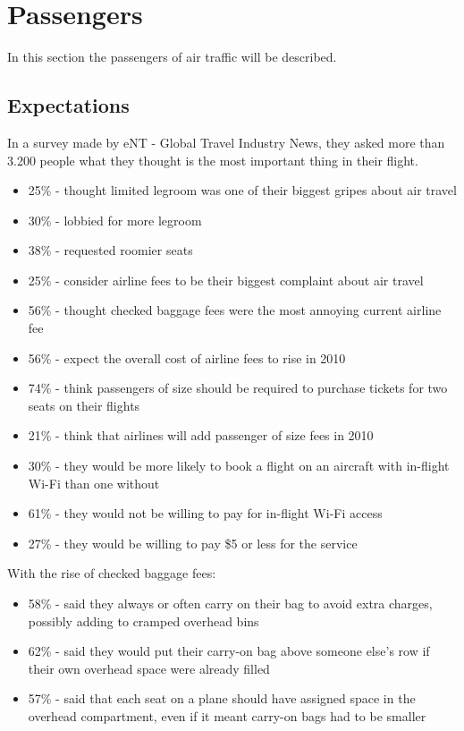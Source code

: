\section{Passengers}

In this section the passengers of air traffic will be described. 

\subsection{Expectations}
In a survey made by eNT - Global Travel Industry News, they asked more than 3.200 people what they thought is the most important thing in their flight.
\begin{itemize}
  \item 25\% - thought limited legroom was one of their biggest gripes about air travel
  \item 30\% - lobbied for more legroom
  \item 38\% - requested roomier seats
  \item 25\% - consider airline fees to be their biggest complaint about air travel
  \item 56\% - thought checked baggage fees were the most annoying current airline fee
  \item 56\% - expect the overall cost of airline fees to rise in 2010
 \item 74\% - think passengers of size should be required to purchase tickets for two seats on their flights
  \item 21\% - think that airlines will add passenger of size fees in 2010
  \item 30\% - they would be more likely to book a flight on an aircraft with in-flight Wi-Fi than one without
  \item 61\% - they would not be willing to pay for in-flight Wi-Fi access
  \item 27\% - they would be willing to pay \$5 or less for the service
\end{itemize}
With the rise of checked baggage fees:
\begin{itemize}
 \item 58\% - said they always or often carry on their bag to avoid extra charges, possibly adding to cramped overhead bins
 \item 62\% - said they would put their carry-on bag above someone else's row if their own overhead space were already filled
 \item 57\% - said that each seat on a plane should have assigned space in the overhead compartment, even if it meant carry-on bags had to be smaller
\end{itemize}


